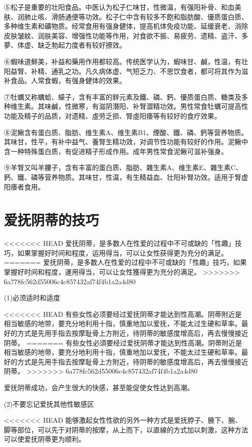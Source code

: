 \documentclass[12pt,UTF8]{ctexbook}
\begin{document}
⑤松子是重要的壮阳食品。中医认为松子仁味甘，性微温，有强阳补骨、和血美肤、润肺止咳、滑肠通便等功效。松子仁中含有较多不飽和脂肪酸、優质蛋白质、多种维生素和礦物质。经常食用有强身健体，提高机体免疫功能、延缓衰老、消除皮肤皱紋、润肤美容、增强性功能等作用，对食欲不振、易疲劳、遗精、盗汗、多夢、体虚、缺乏勃起力度者有较好撩效。

⑥蝦味道鮮美，补益和藥用作用都较高。传统医学认为，蝦味甘、鹹，性温，有壮阳益腎、补精、通乳之功。凡久病体虚、气短乏力、不思饮食者，都可将其作为滋补食品。人常食蝦，有强身健体的效果。

⑦牡蠣又称蠣蛤、蠔子，含有丰富的鋅元素及鐵、磷、鈣、優质蛋白质、糖类及多种维生素。其味鹹，性微寒，有滋阴潛阳、补腎澀精功效。男性常食牡蠣可提高性功能及精子的品质，对遗精、虛劳乏损、腎虛阳痿等有较好的食疗效果。

⑧泥鳅含有蛋白质、脂肪、维生素A、维生素B1、煙酸、鐵、磷、鈣等营养物质。其味甘，性平，有补中益气、養腎生精功效，对调节性功能有较好的作用。泥鳅中含一种特殊蛋白质，有促进精子形成作用。成年男性常食泥鳅可滋补强身。

⑨羊腎又叫羊腰子，含有丰富的蛋白质、脂肪、雜生素A、维生素E、雜生素C、鈣、鐵、磷等营养物质。其味甘，性温，有生精益血、壮阳补腎功效。适用于腎虚阳痿者食用。

\section{爱抚阴蒂的技巧}

<<<<<<< HEAD
爱抚阴蒂，是多数人在性爱的过程中不可或缺的「性趣」技巧，如果掌握好时间和程度，运用得当，可以让女性获得更为充分的满足。
=======
爱抚阴蒂，是多数人在性爱的过程中不可或缺的「性趣」技巧，如果掌握好时间和程度，運用得当，可以让女性獲得更为充分的满足。
>>>>>>> 6a778fc562d55006c4c857432af74f4b1a2a4d80

(1)必须适时和适度

<<<<<<< HEAD
有些女性必须要经过爱抚阴蒂才能达到性高潮。阴蒂附近是相当敏感的地带，要充分地利用十指，慎重地加以爱抚，不能太过生硬和草率。最好的方式是先用手指去按摩耻骨上方附近，待阴蒂的敏感度增高后，再去慢慢接近阴蒂。
=======
有些女性必須要经过爱抚阴蒂才能达到性高潮。阴蒂附近是相当敏感的地带，要充分地利用十指，慎重地加以爱抚，不能太过生硬和草率。最好的方式是先用手指去按摩耻骨上方附近，待阴蒂的敏感度增高后，再去慢慢接近阴蒂。
>>>>>>> 6a778fc562d55006c4c857432af74f4b1a2a4d80

爱抚阴蒂成功，会产生很大的快感，甚至能促使女性达到高潮。

(2)不要忘记爱抚其他性敏感区

<<<<<<< HEAD
能够激起女性性欲的另外一种方式是爱抚脖子、腋下、腕、脚等部位，可以先于对阴蒂的按摩，从上而下，以直線的方式加以刺激，这种方法可以使爱抚阴蒂更为顺利。
\end{document}
